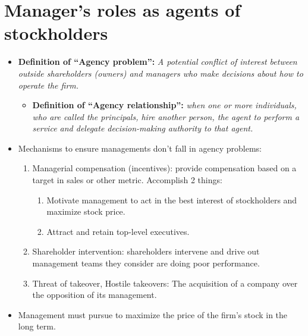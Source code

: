 \documentclass{article}
\renewcommand{\termdefinition}[2]{
    \textbf{Definition of ``#1'':} \emph{#2}
}
\begin{document}
\section{Manager's roles as agents of stockholders}
\begin{itemize}
    \item \termdefinition{Agency problem}{ A potential conflict of interest between outside shareholders (owners) and managers who make decisions about how to operate the firm.} 
        \begin{itemize}
            \item \termdefinition{Agency relationship}{  when one or more individuals, who are called the principals, hire another person, the agent to perform a service and delegate decision-making authority to that agent.} 
        \end{itemize}

    \item Mechanisms to ensure managements don't fall in agency problems: 
        \begin{enumerate}
            \item Managerial compensation (incentives): provide compensation based on a target in sales or other metric. Accomplish 2 things:
                \begin{enumerate}
                    \item Motivate management to act in the best interest of stockholders and maximize stock price. 
                    \item Attract and retain top-level executives. 
                \end{enumerate}
            
            \item Shareholder intervention: shareholders intervene and drive out management teams they consider are doing poor performance. 
            \item Threat of takeover, Hostile takeovers: The acquisition of a company over the opposition of its management.
        \end{enumerate}
    
    \item Management must pursue to maximize the price of the firm’s stock in the long term.
\end{itemize}
\end{document}
